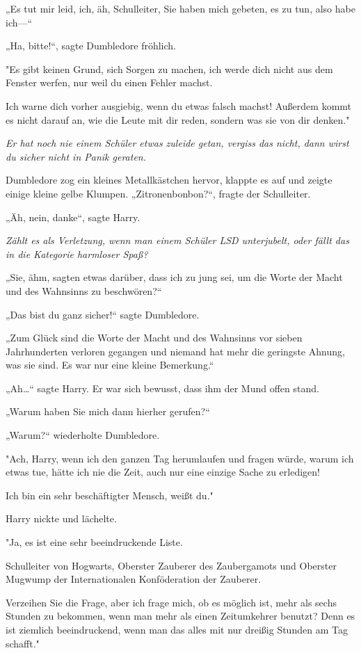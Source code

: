 {„Es tut mir leid, ich, äh, Schulleiter, Sie haben mich gebeten, es zu tun, also habe ich—“

„Ha, bitte!“, sagte Dumbledore fröhlich.

"Es gibt keinen Grund, sich Sorgen zu machen, ich werde dich nicht aus dem Fenster werfen, nur weil du einen Fehler machst.

Ich warne dich vorher ausgiebig, wenn du etwas falsch machst! Außerdem kommt es nicht darauf an, wie die Leute mit dir reden, sondern was sie von dir denken."

\emph{Er hat noch nie einem Schüler etwas zuleide getan, vergiss das nicht, dann wirst du sicher nicht in Panik geraten.}

Dumbledore zog ein kleines Metallkästchen hervor, klappte es auf und zeigte einige kleine gelbe Klumpen. „Zitronenbonbon?“, fragte der Schulleiter.

„Äh, nein, danke“, sagte Harry.

\emph{Zählt es als Verletzung, wenn man einem Schüler LSD unterjubelt, oder fällt das in die Kategorie harmloser Spaß?}

„Sie, ähm, sagten etwas darüber, dass ich zu jung sei, um die Worte der Macht und des Wahnsinns zu beschwören?“

„Das bist du ganz sicher!“ sagte Dumbledore.

„Zum Glück sind die Worte der Macht und des Wahnsinns vor sieben Jahrhunderten verloren gegangen und niemand hat mehr die geringste Ahnung, was sie sind. Es war nur eine kleine Bemerkung.“

„Ah…“ sagte Harry. Er war sich bewusst, dass ihm der Mund offen stand.

„Warum haben Sie mich dann hierher gerufen?“

„Warum?“ wiederholte Dumbledore.

"Ach, Harry, wenn ich den ganzen Tag herumlaufen und fragen würde, warum ich etwas tue, hätte ich nie die Zeit, auch nur eine einzige Sache zu erledigen!

Ich bin ein sehr beschäftigter Mensch, weißt du."

Harry nickte und lächelte.

"Ja, es ist eine sehr beeindruckende Liste.

Schulleiter von Hogwarts, Oberster Zauberer des Zaubergamots und Oberster Mugwump der Internationalen Konföderation der Zauberer.

Verzeihen Sie die Frage, aber ich frage mich, ob es möglich ist, mehr als sechs Stunden zu bekommen, wenn man mehr als einen Zeitumkehrer benutzt? Denn es ist ziemlich beeindruckend, wenn man das alles mit nur dreißig Stunden am Tag schafft."

}
